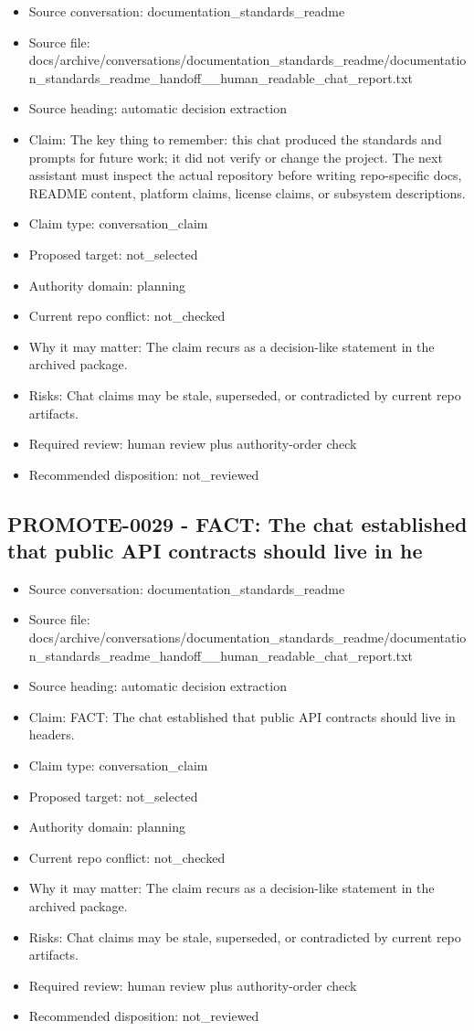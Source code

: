 \documentclass[11pt,a4paper]{report}
\begin{document}
\begin{itemize}
\item Source conversation: documentation\_standards\_readme
\item Source file: docs/archive/conversations/documentation\_standards\_readme/documentation\_standards\_readme\_handoff\_\_human\_readable\_chat\_report.txt
\item Source heading: automatic decision extraction
\item Claim: The key thing to remember: this chat produced the standards and prompts for future work; it did not verify or change the project. The next assistant must inspect the actual repository before writing repo-specific docs, README content, platform claims, license claims, or subsystem descriptions.
\item Claim type: conversation\_claim
\item Proposed target: not\_selected
\item Authority domain: planning
\item Current repo conflict: not\_checked
\item Why it may matter: The claim recurs as a decision-like statement in the archived package.
\item Risks: Chat claims may be stale, superseded, or contradicted by current repo artifacts.
\item Required review: human review plus authority-order check
\item Recommended disposition: not\_reviewed
\end{itemize}

\subsection{PROMOTE-0029 - FACT: The chat established that public API contracts should live in he}

\begin{itemize}
\item Source conversation: documentation\_standards\_readme
\item Source file: docs/archive/conversations/documentation\_standards\_readme/documentation\_standards\_readme\_handoff\_\_human\_readable\_chat\_report.txt
\item Source heading: automatic decision extraction
\item Claim: FACT: The chat established that public API contracts should live in headers.
\item Claim type: conversation\_claim
\item Proposed target: not\_selected
\item Authority domain: planning
\item Current repo conflict: not\_checked
\item Why it may matter: The claim recurs as a decision-like statement in the archived package.
\item Risks: Chat claims may be stale, superseded, or contradicted by current repo artifacts.
\item Required review: human review plus authority-order check
\item Recommended disposition: not\_reviewed
\end{itemize}
\end{document}
